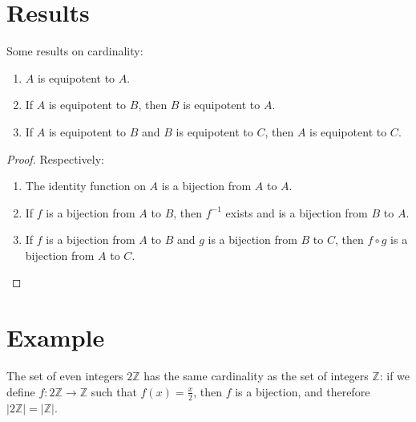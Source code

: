 \documentclass[12pt]{article}
\theoremstyle{definition}
\def\Z{\mathbb{Z}}
\begin{document}
\section*{Results}

Some results on cardinality:

\begin{enumerate}

\item $A$ is equipotent to $A$.

\item If $A$ is equipotent to $B$, then $B$ is equipotent to $A$.

\item If $A$ is equipotent to $B$ and $B$ is equipotent to $C$, then $A$ is equipotent to $C$.

\end{enumerate}

\begin{proof} Respectively:

\begin{enumerate} 

\item The identity function on $A$ is a bijection from $A$ to $A$.

\item If $f$ is a bijection from $A$ to $B$, then $f^{-1}$ exists and is a bijection from $B$ to $A$.

\item If $f$ is a bijection from $A$ to $B$ and $g$ is a bijection from $B$ to $C$, then $f \circ g$ is a bijection from $A$ to $C$.

\end{enumerate}

\end{proof}

\section*{Example}

The set of even integers $2\Z$ has the same cardinality as the set of integers $\Z$: if we define $f\colon 2\Z \to \Z$ such that $f(x) = \frac{x}{2}$,
then $f$ is a bijection, and therefore $|2\Z| = |\Z|$.
\end{document}
